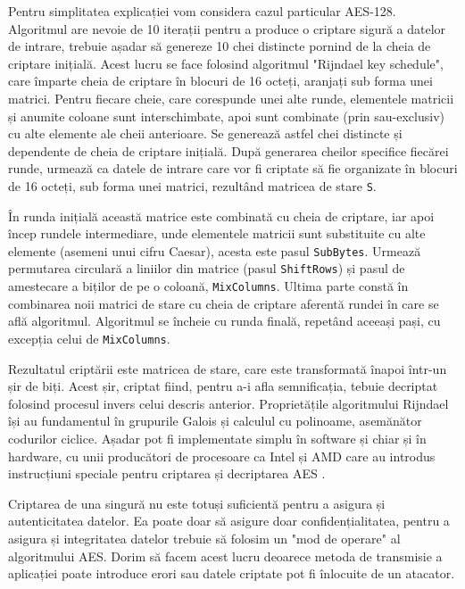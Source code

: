 \documentclass[12pt,a4paper,titlepage]{report}
\begin{document}
Pentru simplitatea explicației vom considera cazul particular AES-128. Algoritmul are nevoie de 10 iterații pentru a produce o criptare sigură a datelor de intrare, trebuie așadar să genereze 10 chei distincte pornind de la cheia de criptare inițială. Acest lucru se face folosind algoritmul "Rijndael key schedule", care împarte cheia de criptare în blocuri de 16 octeți, aranjați sub forma unei matrici. Pentru fiecare cheie, care corespunde unei alte runde, elementele matricii și anumite coloane sunt interschimbate, apoi sunt combinate (prin sau-exclusiv) cu alte elemente ale cheii anterioare. Se generează astfel chei distincte și dependente de cheia de criptare inițială.
După generarea cheilor specifice fiecărei runde, urmează ca datele de intrare care vor fi criptate să fie organizate în blocuri de 16 octeți, sub forma unei matrici, rezultând matricea de stare \texttt{S}.

În runda inițială această matrice este combinată cu cheia de criptare, iar apoi încep rundele intermediare, unde elementele matricii sunt substituite cu alte elemente (asemeni unui cifru Caesar), acesta este pasul \texttt{SubBytes}. Urmează permutarea circulară a liniilor din matrice (pasul \texttt{ShiftRows}) și pasul de amestecare a biților de pe o coloană, \texttt{MixColumns}. Ultima parte constă în combinarea noii matrici de stare cu cheia de criptare aferentă rundei în care se află algoritmul. Algoritmul se încheie cu runda finală, repetând aceeași pași, cu excepția celui de \texttt{MixColumns}.

Rezultatul criptării este matricea de stare, care este transformată înapoi într-un șir de biți. Acest șir, criptat fiind, pentru a-i afla semnificația, tebuie decriptat folosind procesul invers celui descris anterior. Proprietățile algoritmului Rijndael își au fundamentul în grupurile Galois și calculul cu polinoame, asemănător codurilor ciclice. Așadar pot fi implementate simplu în software și chiar și în hardware, cu unii producători de procesoare ca Intel și AMD care au introdus instrucțiuni speciale pentru criptarea și decriptarea AES \cite{intel64}.

Criptarea de una singură nu este totuși suficientă pentru a asigura și autenticitatea datelor. Ea poate doar să asigure doar confidențialitatea, pentru a asigura și integritatea datelor trebuie să folosim un "mod de operare" al algoritmului AES. Dorim să facem acest lucru deoarece metoda de transmisie a aplicației poate introduce erori sau datele criptate pot fi înlocuite de un atacator. 
\end{document}
